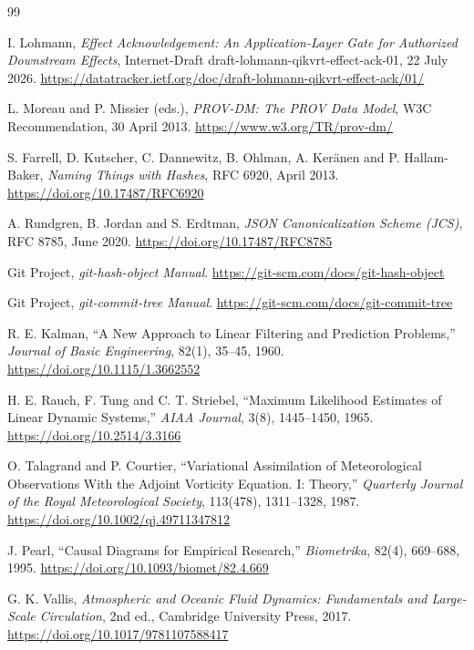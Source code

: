 \documentclass[11pt,a4paper]{article}
\theoremstyle{remark}
\begin{document}
\begin{thebibliography}{99}

I. Lohmann,
\emph{Effect Acknowledgement: An Application-Layer Gate for Authorized
Downstream Effects},
Internet-Draft draft-lohmann-qikvrt-effect-ack-01, 22 July 2026.
\url{https://datatracker.ietf.org/doc/draft-lohmann-qikvrt-effect-ack/01/}

L. Moreau and P. Missier (eds.),
\emph{PROV-DM: The PROV Data Model},
W3C Recommendation, 30 April 2013.
\url{https://www.w3.org/TR/prov-dm/}

S. Farrell, D. Kutscher, C. Dannewitz, B. Ohlman, A. Keränen and
P. Hallam-Baker,
\emph{Naming Things with Hashes},
RFC 6920, April 2013.
\url{https://doi.org/10.17487/RFC6920}

A. Rundgren, B. Jordan and S. Erdtman,
\emph{JSON Canonicalization Scheme (JCS)},
RFC 8785, June 2020.
\url{https://doi.org/10.17487/RFC8785}

Git Project,
\emph{git-hash-object Manual}.
\url{https://git-scm.com/docs/git-hash-object}

Git Project,
\emph{git-commit-tree Manual}.
\url{https://git-scm.com/docs/git-commit-tree}

R. E. Kalman,
``A New Approach to Linear Filtering and Prediction Problems,''
\emph{Journal of Basic Engineering}, 82(1), 35--45, 1960.
\url{https://doi.org/10.1115/1.3662552}

H. E. Rauch, F. Tung and C. T. Striebel,
``Maximum Likelihood Estimates of Linear Dynamic Systems,''
\emph{AIAA Journal}, 3(8), 1445--1450, 1965.
\url{https://doi.org/10.2514/3.3166}

O. Talagrand and P. Courtier,
``Variational Assimilation of Meteorological Observations With the Adjoint
Vorticity Equation. I: Theory,''
\emph{Quarterly Journal of the Royal Meteorological Society}, 113(478),
1311--1328, 1987.
\url{https://doi.org/10.1002/qj.49711347812}

J. Pearl,
``Causal Diagrams for Empirical Research,''
\emph{Biometrika}, 82(4), 669--688, 1995.
\url{https://doi.org/10.1093/biomet/82.4.669}

G. K. Vallis,
\emph{Atmospheric and Oceanic Fluid Dynamics: Fundamentals and Large-Scale
Circulation}, 2nd ed., Cambridge University Press, 2017.
\url{https://doi.org/10.1017/9781107588417}


\end{thebibliography}
\end{document}
